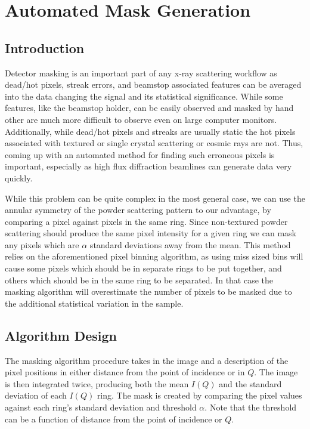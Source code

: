 \section{Automated Mask Generation} \label{subsec:mask}
\subsection{Introduction}
Detector masking is an important part of any x-ray scattering workflow as dead/hot pixels, streak errors, and beamstop associated features can be averaged into the data changing the signal and its statistical significance.
While some features, like the beamstop holder, can be easily observed and masked by hand other are much more difficult to observe even on large computer monitors.
Additionally, while dead/hot pixels and streaks are usually static the hot pixels associated with textured or single crystal scattering or cosmic rays are not.
Thus, coming up with an automated method for finding such erroneous pixels is important, especially as high flux diffraction beamlines can generate data very quickly.

While this problem can be quite complex in the most general case, we can use the annular symmetry of the powder scattering pattern to our advantage, by comparing a pixel against pixels in the same ring.
Since non-textured powder scattering should produce the same pixel intensity for a given ring we can mask any pixels which are $\alpha$ standard deviations away from the mean.
This method relies on the aforementioned pixel binning algorithm, as using miss sized bins will cause some pixels which should be in separate rings to be put together, and others which should be in the same ring to be separated.
In that case the masking algorithm will overestimate the number of pixels to be masked due to the additional statistical variation in the sample.

\subsection{Algorithm Design}
The masking algorithm procedure takes in the image and a description of the pixel positions in either distance from the point of incidence or in $Q$.
The image is then integrated twice, producing both the mean $I(Q)$ and the standard deviation of each $I(Q)$ ring.
The mask is created by comparing the pixel values against each ring's standard deviation and threshold $\alpha$.
Note that the threshold can be a function of distance from the point of incidence or $Q$.

